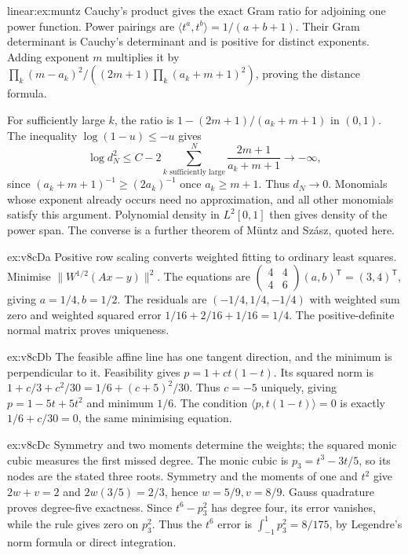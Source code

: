 \begin{solution}{linear:ex:muntz}
\idea Cauchy's product gives the exact Gram ratio for adjoining one power function.
\writeup Power pairings are $\langle t^a,t^b\rangle=1/(a+b+1)$. Their Gram determinant is Cauchy's determinant and is positive for distinct exponents. Adding exponent $m$ multiplies it by $\prod_k(m-a_k)^2/((2m+1)\prod_k(a_k+m+1)^2)$, proving the distance formula.

For sufficiently large $k$, the ratio is $1-(2m+1)/(a_k+m+1)$ in $(0,1)$. The inequality $\log(1-u)\le-u$ gives
\[\log d_N^2\le C-2\sum_{k\text{ sufficiently large}}^N\frac{2m+1}{a_k+m+1}\longrightarrow-\infty,
\]
since $(a_k+m+1)^{-1}\ge(2a_k)^{-1}$ once $a_k\ge m+1$. Thus $d_N\to0$. Monomials whose exponent already occurs need no approximation, and all other monomials satisfy this argument. Polynomial density in $L^2[0,1]$ then gives density of the power span. The converse is a further theorem of M\"untz and Sz\'asz, quoted here.
\end{solution}
\begin{solution}{ex:v8cDa}
\idea Positive row scaling converts weighted fitting to ordinary least squares.
\writeup Minimise $\|W^{1/2}(Ax-y)\|^2$. The equations are $\begin{pmatrix}4&4\\4&6\end{pmatrix}(a,b)^{\mathsf T}=(3,4)^{\mathsf T}$, giving $a=1/4,b=1/2$. The residuals are $(-1/4,1/4,-1/4)$ with weighted sum zero and weighted squared error $1/16+2/16+1/16=1/4$. The positive-definite normal matrix proves uniqueness.
\end{solution}
\begin{solution}{ex:v8cDb}
\idea The feasible affine line has one tangent direction, and the minimum is perpendicular to it.
\writeup Feasibility gives $p=1+ct(1-t)$. Its squared norm is $1+c/3+c^2/30=1/6+(c+5)^2/30$. Thus $c=-5$ uniquely, giving $p=1-5t+5t^2$ and minimum $1/6$. The condition $\langle p,t(1-t)\rangle=0$ is exactly $1/6+c/30=0$, the same minimising equation.
\end{solution}
\begin{solution}{ex:v8cDc}
\idea Symmetry and two moments determine the weights; the squared monic cubic measures the first missed degree.
\writeup The monic cubic is $p_3=t^3-3t/5$, so its nodes are the stated three roots. Symmetry and the moments of one and $t^2$ give $2w+v=2$ and $2w(3/5)=2/3$, hence $w=5/9,v=8/9$. Gauss quadrature proves degree-five exactness. Since $t^6-p_3^2$ has degree four, its error vanishes, while the rule gives zero on $p_3^2$. Thus the $t^6$ error is $\int_{-1}^1p_3^2=8/175$, by Legendre's norm formula or direct integration.
\end{solution}
